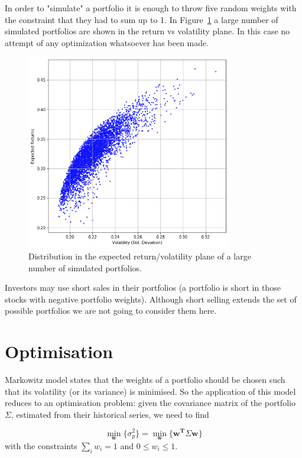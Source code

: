 In order to "simulate" a portfolio it is enough to throw five random weights 
with the constraint that they had to sum up to 1. 
In Figure~\ref{fig:mc_portfolio} a large number of simulated portfolios are shown in the return vs volatility plane. 
In this case no attempt of any optimization whatsoever has been made.

\begin{figure}[hbt]
\centering
\includegraphics[width=0.8\textwidth]{figures/return_variance}
\caption{Distribution in the expected return/volatility plane of a large number of simulated portfolios.}
\label{fig:mc_portfolio}
\end{figure}

Investors may use short sales in their portfolios (a portfolio is short in those stocks with negative portfolio weights). 
Although short selling extends the set of possible portfolios we are not going to consider them here.

\section{Optimisation}\label{optimization}

Markowitz model states that the weights of a portfolio should be chosen 
such that its volatility (or its variance) is minimised. 
So the application of this model reduces to
an optimisation problem: given the covariance matrix of the portfolio
$\Sigma$, estimated from their historical series, we need to find

\begin{equation}\underset{\mathbf{w}}{\min}\{\sigma_p^2\} = \underset{\mathbf{w}}{\min}\{\mathbf{w^T}\Sigma\mathbf{w}\}\end{equation}
with the constraints \(\sum_{i}w_i = 1\) and \(0 \le w_i \le 1\).

